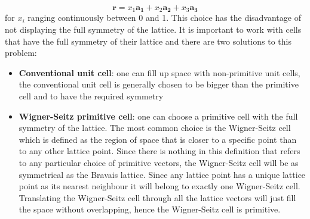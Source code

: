 \documentclass[10.75pt,a4paper,openright,bottom=2cm]{article}
\renewcommand{\Vec}[1]{\boldsymbol{#1}}
\begin{document}
\[
\Vec{r}=x_1\Vec{a_1}+x_2\Vec{a_2}+x_3\Vec{a_3}
\]
for $x_i$ ranging continuously between 0 and 1. This choice has the disadvantage of not displaying the full symmetry of the lattice. It is important to work with cells that have the full symmetry of their lattice and there are two solutions to this problem:
\begin{itemize}
    \item \textbf{Conventional unit cell}: one can fill up space with non-primitive unit cells, the conventional unit cell is generally chosen to be bigger than the primitive cell and to have the required symmetry
    \item \textbf{Wigner-Seitz primitive cell}: one can choose a primitive cell with the full symmetry of the lattice. The most common choice is the Wigner-Seitz cell which is defined as the region of space that is closer to a specific point than to any other lattice point. Since there is nothing in this definition that refers to any particular choice of primitive vectors, the Wigner-Seitz cell will be as symmetrical as the Bravais lattice. Since any lattice point has a unique lattice point as its nearest neighbour it will belong to exactly one Wigner-Seitz cell. Translating the Wigner-Seitz cell through all the lattice vectors will just fill the space without overlapping, hence the Wigner-Seitz cell is primitive.
\end{itemize}
\newpage
\end{document}

